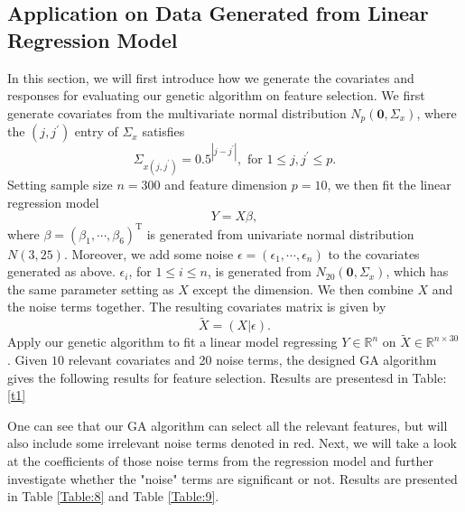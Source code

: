 \documentclass{article}
\begin{document}
\subsection{Application on Data Generated from Linear Regression Model}\label{s3.1}
In this section, we will first introduce how we generate the covariates and responses for evaluating our genetic algorithm on feature selection. We first generate covariates from the multivariate normal distribution $N_{p}(\bm{0}, \Sigma_{x})$, where the $(j, j^{\prime})$ entry of $\Sigma_{x}$ satisfies
$$
\Sigma_{x(j,j^{\prime})} = 0.5^{|j-j^{\prime}|}, \mbox{ for } 1\leq j, j^{\prime}\leq p.
$$
Setting sample size $n=300$ and feature dimension $p=10$, we then fit the linear regression model
$$
Y = X\beta,
$$
where $\beta=(\beta_{1}, \cdots, \beta_{6})^{\mathrm{T}}$ is generated from univariate normal distribution $N(3, 25)$. Moreover, we add some noise $\epsilon=(\epsilon_{1}, \cdots, \epsilon_{n})$ to the covariates generated as above. $\epsilon_{i}$, for $1\leq i \leq n$, is generated from $N_{20}(\bm{0}, \Sigma_{x})$, which has the same parameter setting as $X$ except the dimension. We then combine $X$ and the noise terms together. The resulting covariates matrix is given by
$$
\tilde{X} = (X|\epsilon).
$$
Apply our genetic algorithm to fit a linear model regressing $Y\in \mathbb{R}^{n}$ on $\tilde{X}\in \mathbb{R}^{n\times 30}$. Given $10$ relevant covariates and 20 noise terms, the designed GA algorithm gives the following results for feature selection. Results are presentesd in Table: \ref{t1}
\begin{table}[ht]
\centering
\caption{Selected Genotypes}
\label{t1}
\end{table}

One can see that our GA algorithm can select all the relevant features, but will also include some irrelevant noise terms denoted in red. Next, we will take a look at the coefficients of those noise terms from the regression model and further investigate whether the "noise" terms are significant or not. Results are presented in Table \ref{Table:8} and Table \ref{Table:9}.
\end{document}
